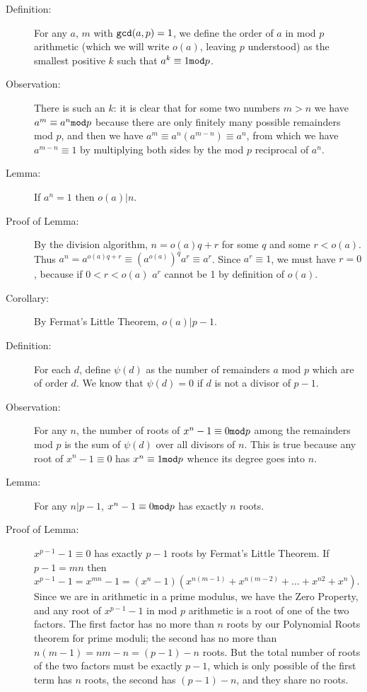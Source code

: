 \documentclass[12pt]{article}
\begin{document}
\begin{description}

\item[Definition:]  For any $a$, $m$ with ${\tt gcd}(a,p)=1$, we define the order of $a$ in mod $p$ arithmetic (which we will write $o(a)$, leaving
$p$ understood) as the smallest positive $k$ such that $a^k\equiv 1{\tt mod}p$.

\item[Observation:]  There is such an $k$:  it is clear that for some two numbers $m>n$ we have $a^m\equiv a^n{\tt mod}p$ because there are only finitely many
possible remainders mod $p$, and then we have $a^m\equiv a^n(a^{m-n})\equiv a^n$, from which we have $a^{m-n}\equiv 1$ by multiplying both sides by the mod $p$ reciprocal of $a^n$.

\item[Lemma:]  If $a^n=1$ then $o(a)|n$.

\item[Proof of Lemma:]  By the division algorithm, $n=o(a)q+r$ for some $q$ and some $r<o(a)$.  Thus $a^n=a^{o(a)q+r}\equiv (a^{o(a)})^qa^r\equiv a^r$.
Since $a^r\equiv 1$, we must have $r=0$, because if $0<r<o(a)$ $a^r$ cannot be 1 by definition of $o(a)$.

\item[Corollary:]  By Fermat's Little Theorem, $o(a)|p-1$.

\item[Definition:]   For each $d$, define $\psi(d)$ as the number of remainders $a$ mod $p$ which are of order $d$.  We know that $\psi(d)=0$ if $d$ is not a divisor of
$p-1$.

\item[Observation:]   For any $n$, the number of roots of $x^n-1 \equiv 0{\tt mod}p$ among the remainders mod $p$ is the sum of $\psi(d)$ over all divisors of $n$.
This is true because any root of $x^n-1 \equiv 0$ has $x^n\equiv 1{\tt mod}p$ whence its degree goes into $n$.

\item[Lemma:]  For any $n|p-1$, $x^n-1 \equiv 0{\tt mod}p$  has exactly $n$ roots.

\item[Proof of Lemma:] $x^{p-1}-1 \equiv 0$ has exactly $p-1$ roots by Fermat's Little Theorem.   If $p-1=mn$ then $x^{p-1}-1=x^{mn}-1=(x^n-1)(x^{n(m-1)}+x^{n(m-2)}+\ldots+x^{n2}+x^n)$.   Since we are in arithmetic in a prime modulus,
we have the Zero Property, and any root of $x^{p-1}-1$ in mod $p$ arithmetic is a root of one of the two factors.  The first factor has no more than $n$ roots by our Polynomial Roots theorem for prime moduli; the second has no more
than $n(m-1)=nm-n=(p-1)-n$ roots.  But the total number of roots of the two factors must be exactly $p-1$, which is only possible of the first term has $n$ roots, the second has $(p-1)-n$, and they share no roots.


\end{description}
\end{document}
